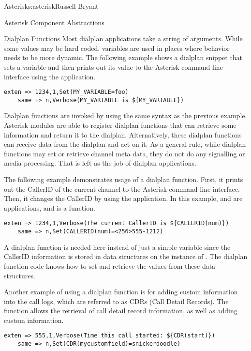 \begin{aosachapter}{Asterisk}{s:asterisk}{Russell Bryant}
\begin{aosasect1}{Asterisk Component Abstractions}
\begin{aosasect2}{Dialplan Functions}
Most dialplan applications take a string of arguments.  While some
values may be hard coded, variables are used in places where behavior
needs to be more dynamic.  The following example shows a dialplan
snippet that sets a variable and then prints out its value to the
Asterisk command line interface using the  application.

\begin{verbatim}
exten => 1234,1,Set(MY_VARIABLE=foo)
    same => n,Verbose(MY_VARIABLE is ${MY_VARIABLE})
\end{verbatim}

Dialplan functions are invoked by using the same syntax as the
previous example. Asterisk modules are able to register dialplan
functions that can retrieve some information and return it to the
dialplan. Alternatively, these dialplan functions can receive data
from the dialplan and act on it. As a general rule, while dialplan
functions may set or retrieve channel meta data, they do not do any
signalling or media processing. That is left as the job of dialplan
applications.

The following example demonstrates usage of a dialplan function.
First, it prints out the CallerID of the current channel to the
Asterisk command line interface. Then, it changes the CallerID by
using the  application. In this example, 
and  are applications, and  is a function.

\begin{verbatim}
exten => 1234,1,Verbose(The current CallerID is ${CALLERID(num)})
    same => n,Set(CALLERID(num)=<256>555-1212)
\end{verbatim}

\noindent A dialplan function is needed here instead of just a simple variable
since the CallerID information is stored in data structures on the
instance of . The dialplan function code knows how
to set and retrieve the values from these data structures.

Another example of using a dialplan function is for adding custom
information into the call logs, which are referred to as CDRs (Call
Detail Records). The  function allows the retrieval of call
detail record information, as well as adding custom information.

\begin{verbatim}
exten => 555,1,Verbose(Time this call started: ${CDR(start)})
    same => n,Set(CDR(mycustomfield)=snickerdoodle)
\end{verbatim}


\end{aosasect2}
\end{aosasect1}
\end{aosachapter}
